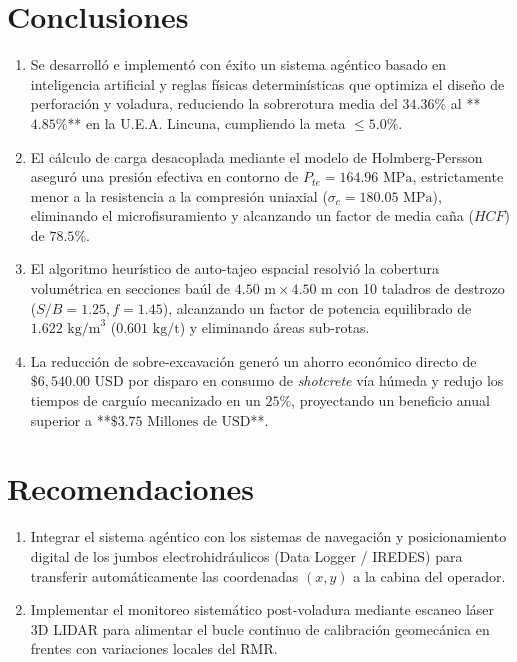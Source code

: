 \documentclass[12pt,a4paper,oneside]{book}
\begin{document}
\section{Conclusiones}
\begin{enumerate}
    \item Se desarrolló e implementó con éxito un sistema agéntico basado en inteligencia artificial y reglas físicas determinísticas que optimiza el diseño de perforación y voladura, reduciendo la sobrerotura media del $34.36\%$ al **$4.85\%$** en la U.E.A. Lincuna, cumpliendo la meta $\le 5.0\%$.
    \item El cálculo de carga desacoplada mediante el modelo de Holmberg-Persson aseguró una presión efectiva en contorno de $P_{te} = 164.96\text{ MPa}$, estrictamente menor a la resistencia a la compresión uniaxial ($\sigma_c = 180.05\text{ MPa}$), eliminando el microfisuramiento y alcanzando un factor de media caña ($HCF$) de $78.5\%$.
    \item El algoritmo heurístico de auto-tajeo espacial resolvió la cobertura volumétrica en secciones baúl de $4.50\text{ m} \times 4.50\text{ m}$ con 10 taladros de destrozo ($S/B = 1.25, f = 1.45$), alcanzando un factor de potencia equilibrado de $1.622\text{ kg/m}^3$ ($0.601\text{ kg/t}$) y eliminando áreas sub-rotas.
    \item La reducción de sobre-excavación generó un ahorro económico directo de $\$6,540.00\text{ USD}$ por disparo en consumo de \textit{shotcrete} vía húmeda y redujo los tiempos de carguío mecanizado en un $25\%$, proyectando un beneficio anual superior a **$\$3.75\text{ Millones de USD}$**.
\end{enumerate}

\section{Recomendaciones}
\begin{enumerate}
    \item Integrar el sistema agéntico con los sistemas de navegación y posicionamiento digital de los jumbos electrohidráulicos (Data Logger / IREDES) para transferir automáticamente las coordenadas $(x,y)$ a la cabina del operador.
    \item Implementar el monitoreo sistemático post-voladura mediante escaneo láser 3D LIDAR para alimentar el bucle continuo de calibración geomecánica en frentes con variaciones locales del RMR.
\end{enumerate}
\end{document}
